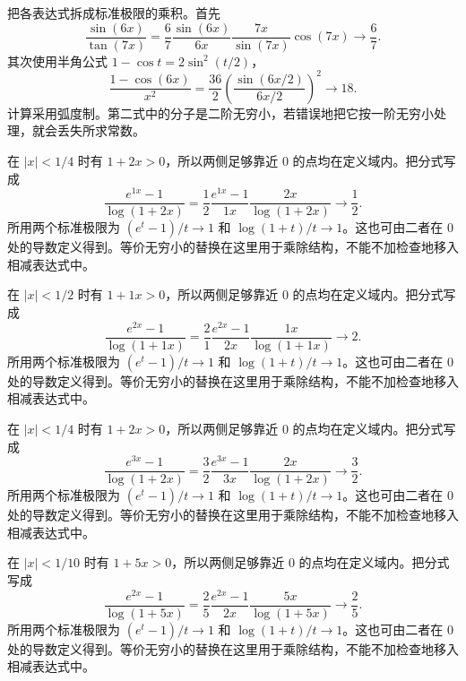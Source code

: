 \documentclass[UTF8,12pt,a4paper,fontset=fandol]{ctexart}
\begin{document}
\begin{solve}\label{ans:c3q13}
把各表达式拆成标准极限的乘积。首先
\[
\frac{\sin(6x)}{\tan(7x)}=\frac{6}{7}\frac{\sin(6x)}{6x}\frac{7x}{\sin(7x)}\cos(7x)\longrightarrow \frac{6}{7}.
\]
其次使用半角公式 $1-\cos t=2\sin^2(t/2)$，
\[
\frac{1-\cos(6x)}{x^2}=\frac{36}2\left(\frac{\sin(6x/2)}{6x/2}\right)^2\longrightarrow 18.
\]
计算采用弧度制。第二式中的分子是二阶无穷小，若错误地把它按一阶无穷小处理，就会丢失所求常数。
\end{solve}

\begin{solve}\label{ans:c3q14}
在 $|x|<1/4$ 时有 $1+2x>0$，所以两侧足够靠近 $0$ 的点均在定义域内。把分式写成
\[
\frac{e^{1x}-1}{\log(1+2x)}=\frac{1}{2}\frac{e^{1x}-1}{1x}\frac{2x}{\log(1+2x)}\longrightarrow \frac{1}{2}.
\]
所用两个标准极限为 $(e^t-1)/t\to1$ 和 $\log(1+t)/t\to1$。这也可由二者在 $0$ 处的导数定义得到。等价无穷小的替换在这里用于乘除结构，不能不加检查地移入相减表达式中。
\end{solve}

\begin{solve}\label{ans:c3q15}
在 $|x|<1/2$ 时有 $1+1x>0$，所以两侧足够靠近 $0$ 的点均在定义域内。把分式写成
\[
\frac{e^{2x}-1}{\log(1+1x)}=\frac{2}{1}\frac{e^{2x}-1}{2x}\frac{1x}{\log(1+1x)}\longrightarrow 2.
\]
所用两个标准极限为 $(e^t-1)/t\to1$ 和 $\log(1+t)/t\to1$。这也可由二者在 $0$ 处的导数定义得到。等价无穷小的替换在这里用于乘除结构，不能不加检查地移入相减表达式中。
\end{solve}

\begin{solve}\label{ans:c3q16}
在 $|x|<1/4$ 时有 $1+2x>0$，所以两侧足够靠近 $0$ 的点均在定义域内。把分式写成
\[
\frac{e^{3x}-1}{\log(1+2x)}=\frac{3}{2}\frac{e^{3x}-1}{3x}\frac{2x}{\log(1+2x)}\longrightarrow \frac{3}{2}.
\]
所用两个标准极限为 $(e^t-1)/t\to1$ 和 $\log(1+t)/t\to1$。这也可由二者在 $0$ 处的导数定义得到。等价无穷小的替换在这里用于乘除结构，不能不加检查地移入相减表达式中。
\end{solve}

\begin{solve}\label{ans:c3q17}
在 $|x|<1/10$ 时有 $1+5x>0$，所以两侧足够靠近 $0$ 的点均在定义域内。把分式写成
\[
\frac{e^{2x}-1}{\log(1+5x)}=\frac{2}{5}\frac{e^{2x}-1}{2x}\frac{5x}{\log(1+5x)}\longrightarrow \frac{2}{5}.
\]
所用两个标准极限为 $(e^t-1)/t\to1$ 和 $\log(1+t)/t\to1$。这也可由二者在 $0$ 处的导数定义得到。等价无穷小的替换在这里用于乘除结构，不能不加检查地移入相减表达式中。
\end{solve}
\end{document}

